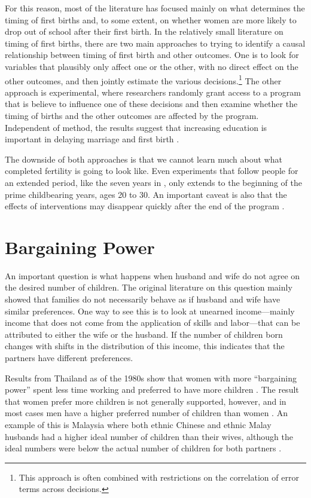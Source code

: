 For this reason, most of the literature has focused mainly on what determines the timing of first births and, to some extent, on whether women are more likely to drop out of school after their first birth. In the relatively small literature on timing of first births, there are two main approaches to trying to identify a causal relationship between timing of first birth and other outcomes. One is to look for variables that plausibly only affect one or the other, with no direct effect on the other outcomes, and then jointly estimate the various decisions.\footnote{This approach is often combined with restrictions on the correlation of error terms across decisions.} The other approach is experimental, where researchers randomly grant access to a program that is believe to influence one of these decisions and then examine whether the timing of births and the other outcomes are affected by the program. Independent of method, the results suggest that increasing education is important in delaying marriage and first birth \citep{Duflo2015,Marchetta2016}.

The downside of both approaches is that we cannot learn much about what completed fertility is going to look like. Even experiments that follow people for an extended period, like the seven years in \citet{Duflo2015}, only extends to the beginning of the prime childbearing years, ages 20 to 30. An important caveat is also that the effects of interventions may disappear quickly after the end of the program \citep{Baird2016}.

\section{Bargaining Power}\label{bargaining-power}

An important question is what happens when husband and wife do not agree on the desired number of children. The original literature on this question mainly showed that families do not necessarily behave as if husband and wife have similar preferences. One way to see this is to look at unearned income---mainly income that does not come from the application of skills and labor---that can be attributed to either the wife or the husband. If the number of children born changes with shifts in the distribution of this income, this indicates that the partners have different preferences.

Results from Thailand as of the 1980s show that women with more ``bargaining power'' spent less time working and preferred to have more children \citep{Schultz1990}. The result that women prefer more children is not generally supported, however, and in most cases men have a higher preferred number of children than women \citep{Westoff2010}. An example of this is Malaysia where both ethnic Chinese and ethnic Malay husbands had a higher ideal number of children than their wives, although the ideal numbers were below the actual number of children for both partners \citep{Rasul2008}.

